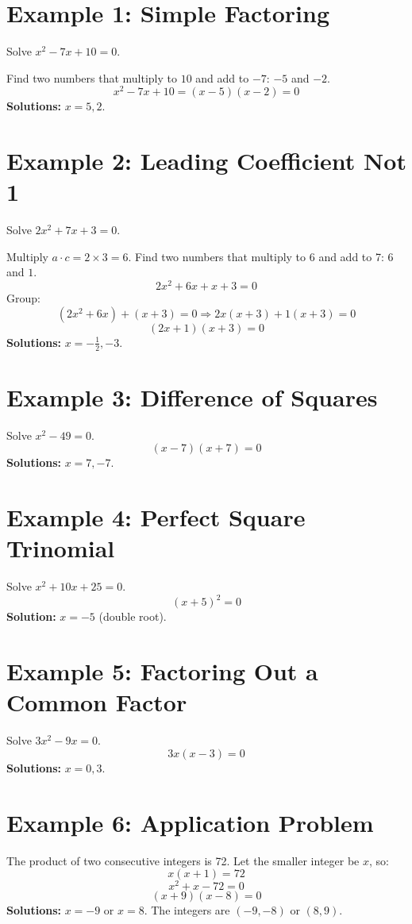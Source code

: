 \documentclass[12pt]{article}
\begin{document}
\section*{Example 1: Simple Factoring}

Solve \(x^2 - 7x + 10 = 0.\)

Find two numbers that multiply to \(10\) and add to \(-7\): \(-5\) and \(-2.\)
\[
x^2 - 7x + 10 = (x - 5)(x - 2) = 0
\]
\textbf{Solutions:} \(x = 5, 2.\)

\section*{Example 2: Leading Coefficient Not 1}

Solve \(2x^2 + 7x + 3 = 0.\)

Multiply \(a \cdot c = 2 \times 3 = 6.\)  
Find two numbers that multiply to 6 and add to 7: \(6\) and \(1.\)
\[
2x^2 + 6x + x + 3 = 0
\]
Group:
\[
(2x^2 + 6x) + (x + 3) = 0 \Rightarrow 2x(x + 3) + 1(x + 3) = 0
\]
\[
(2x + 1)(x + 3) = 0
\]
\textbf{Solutions:} \(x = -\tfrac{1}{2}, -3.\)

\section*{Example 3: Difference of Squares}

Solve \(x^2 - 49 = 0.\)
\[
(x - 7)(x + 7) = 0
\]
\textbf{Solutions:} \(x = 7, -7.\)

\section*{Example 4: Perfect Square Trinomial}

Solve \(x^2 + 10x + 25 = 0.\)
\[
(x + 5)^2 = 0
\]
\textbf{Solution:} \(x = -5\) (double root).

\section*{Example 5: Factoring Out a Common Factor}

Solve \(3x^2 - 9x = 0.\)
\[
3x(x - 3) = 0
\]
\textbf{Solutions:} \(x = 0, 3.\)

\section*{Example 6: Application Problem}

The product of two consecutive integers is 72.  
Let the smaller integer be \(x\), so:
\[
x(x + 1) = 72
\]
\[
x^2 + x - 72 = 0
\]
\[
(x + 9)(x - 8) = 0
\]
\textbf{Solutions:} \(x = -9\) or \(x = 8.\)  
The integers are \((-9, -8)\) or \((8, 9).\)
\end{document}
